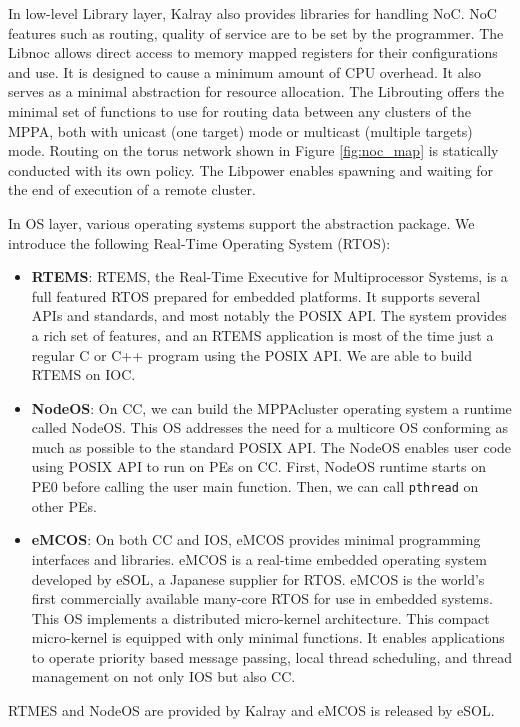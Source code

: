 \documentclass{sig-alternate-05-2015}
\begin{document}
In low-level Library layer, Kalray also provides libraries for handling NoC.
NoC features such as routing, quality of service are to be set by the programmer.
The Libnoc allows direct access to memory mapped registers for their configurations and use.
It is designed to cause a minimum amount of CPU overhead.
It also serves as a minimal abstraction for resource allocation.
The Librouting offers the minimal set of functions to use for routing data between any clusters of the MPPA,
both with unicast (one target) mode or multicast (multiple targets) mode.
Routing on the torus network shown in Figure \ref{fig:noc_map} is statically conducted with its own policy.
The Libpower enables spawning and waiting for the end of execution of a remote cluster.

In OS layer, various operating systems support the abstraction package.
We introduce the following Real-Time Operating System (RTOS):
\begin{itemize}
\item \textbf{RTEMS}: RTEMS, the Real-Time Executive for Multiprocessor Systems, is a full featured RTOS prepared for embedded platforms.
It supports several APIs and standards, and most notably the POSIX API.
The system provides a rich set of features, and an RTEMS application is most of the time just a regular C or C++ program using the POSIX API.
We are able to build RTEMS on IOC.
\item \textbf{NodeOS}: On CC, we can build the MPPAcluster operating system a runtime called NodeOS.
This OS addresses the need for a multicore OS conforming as much as possible to the standard POSIX API.
The NodeOS enables user code using POSIX API to run on PEs on CC.
First, NodeOS runtime starts on PE0 before calling the user main function.
Then, we can call \texttt{pthread} on other PEs.
\item \textbf{eMCOS}: On both CC and IOS, eMCOS provides minimal programming interfaces and libraries.
eMCOS is a real-time embedded operating system developed by eSOL, a Japanese supplier for RTOS.
eMCOS is the world's first commercially available many-core RTOS for use in embedded systems.
This OS implements a distributed micro-kernel architecture.
This compact micro-kernel is equipped with only minimal functions.
It enables applications to operate priority based message passing, local thread scheduling, and thread management on not only IOS but also CC.
\end{itemize}
RTMES and NodeOS are provided by Kalray and eMCOS is released by eSOL.
\end{document}
